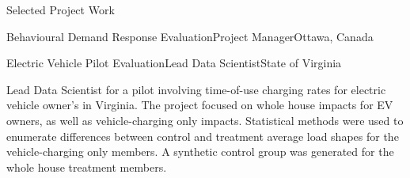 \documentclass{resume} %
\begin{document}
\begin{rSection}{Selected Project Work}
\begin{rSubsection}{Behavioural Demand Response Evaluation}{}{Project Manager}{Ottawa, Canada}
\end{rSubsection}




\begin{rSubsection}{Electric Vehicle Pilot Evaluation}{}{Lead Data Scientist}{State of Virginia}
\item[] Lead Data Scientist for a pilot involving time-of-use charging rates for electric vehicle owner's in Virginia. The project focused on whole house impacts for EV owners, as well as vehicle-charging only impacts. Statistical methods were used to enumerate differences between control and treatment average load shapes for the vehicle-charging only members. A synthetic control group was generated for the whole house treatment members.
\end{rSubsection}


\end{rSection}
\end{document}
